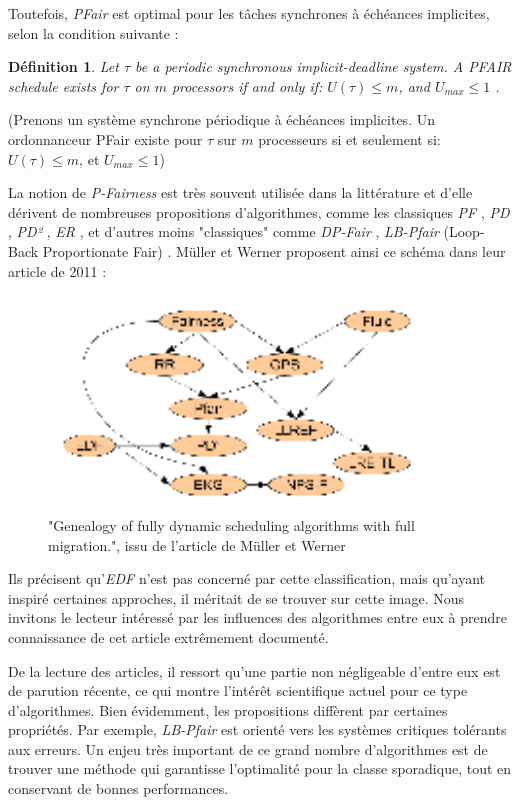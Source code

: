 \documentclass[11pt,a4paper,oneside]{report}
\newtheorem{mydef}{Définition}
\begin{document}
	Toutefois, \textit{PFair} est optimal pour les tâches synchrones à échéances implicites, selon 
	la condition suivante :\medskip
	\begin{mydef}
		Let $\tau$ be a periodic synchronous implicit-deadline system.
		A PFAIR schedule exists for $\tau$ on $m$ processors if and only if:\medskip
		$U(\tau) \leq m$, and $U_{max} \leq 1$ \cite{baruah_proportionate_1996}.
	\end{mydef}
	(Prenons un système synchrone périodique à échéances implicites. 
	Un ordonnanceur PFair existe pour $\tau$ sur $m$ processeurs si et seulement si:\medskip
	$U(\tau) \leq m$, et $U_{max} \leq 1$)\medskip
	
	La notion de \textit{P-Fairness} est très souvent utilisée dans la littérature et d'elle dérivent 
	de nombreuses propositions d'algorithmes, comme les classiques \textit{PF} \cite{baruah_proportionate_1996}, \textit{PD} \cite{baruah_fast_1995}, \textit{PD²} \cite{srinivasan_optimal_2006} , \textit{ER} \cite{anderson_early-release_2000}, 
	et d'autres moins "classiques" comme \textit{DP-Fair} \cite{levin_dp-fair_2010}, 
	\textit{LB-Pfair} (Loop-Back Proportionate Fair) \cite{kramer_proportionate_2015}. 
	Müller et Werner proposent ainsi ce schéma dans leur article de 2011 :\medskip
	\begin{figure}[ht]
		\caption{"Genealogy of fully dynamic scheduling algorithms with full migration.", issu de l'article de Müller et Werner\cite{muller_genealogy_2011}}
		\includegraphics[width=10cm]{img/genealogy_pf}
	\end{figure}
	Ils précisent qu'\textit{EDF} n'est pas concerné par cette classification, mais qu'ayant 
	inspiré certaines approches, il méritait de se trouver sur cette image. 
	Nous invitons le lecteur intéressé par les influences des algorithmes entre eux 
	à prendre connaissance de cet article extrêmement documenté.\medskip
	
	De la lecture des articles, il ressort qu'une partie non négligeable d'entre eux 
	est de parution récente, ce qui montre l'intérêt scientifique actuel pour ce type d'algorithmes. 
	Bien évidemment, les propositions diffèrent par certaines propriétés. Par exemple, 
	\textit{LB-Pfair} est orienté vers les systèmes critiques tolérants aux erreurs. 
	Un enjeu très important de ce grand nombre d'algorithmes est de trouver une méthode qui 
	garantisse l'optimalité pour la classe sporadique, tout en conservant de bonnes performances. 
	
\end{document}
